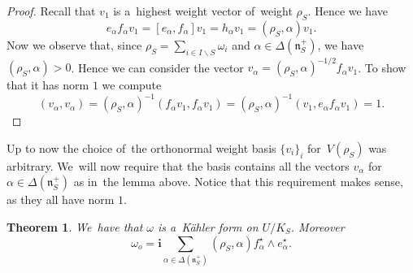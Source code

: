 \documentclass[10pt,a4paper]{amsart}
\numberwithin{equation}{section}
\newtheorem{Theorem}{Theorem}[section]
\newcommand{\lien}{\mathfrak{n}}
\newcommand{\iu}{\boldsymbol{i}}
\newcommand{\kafo}{\omega}
\newcommand{\homroot}{\Delta(\lien_S^+)}
\begin{document}
\begin{proof}
Recall that $v_1$ is a~highest weight vector of~weight $\rho_S$. Hence we have
\[
e_\alpha f_\alpha v_1 = [e_\alpha, f_\alpha] v_1 = h_\alpha v_1 = (\rho_S, \alpha) v_1.
\]
Now we observe that, since $\rho_S = \sum_{i \in I \backslash S} \omega_i$ and $\alpha \in \homroot$, we have $(\rho_S, \alpha) > 0$.
Hence we can consider the vector $v_\alpha = (\rho_S, \alpha)^{-1/2} f_\alpha v_1$.
To show that it has norm $1$ we compute
\[
(v_\alpha, v_\alpha) = (\rho_S, \alpha)^{-1} (f_\alpha v_1, f_\alpha v_1)
= (\rho_S, \alpha)^{-1} (v_1, e_\alpha f_\alpha v_1) = 1. \tag*{\qed}
\]
\renewcommand{\qed}{}
\end{proof}

Up to now the choice of~the orthonormal weight basis $\{v_i\}_i$ for~$V(\rho_S)$ was arbitrary.
We~will now require that the basis contains all the vectors $v_\alpha$ for~$\alpha \in \homroot$ as in~the lemma above.
Notice that this requirement makes sense, as they all have norm $1$.

\begin{Theorem}
\label{thm:kahler-form}
We~have that $\kafo$ is a~K\"ahler form on $U / K_S$. Moreover
\[
\kafo_o = \iu \sum_{\alpha \in \homroot} (\rho_S, \alpha) f_\alpha^\star \wedge e_\alpha^\star.
\]
\end{Theorem}
\end{document}

